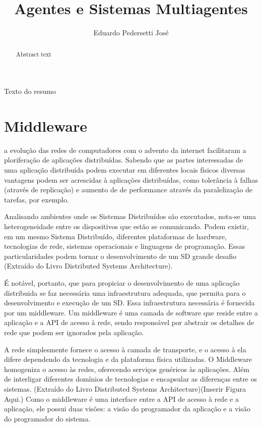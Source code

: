 \documentclass[12pt]{article}
\title{Agentes e Sistemas Multiagentes}
\author{Eduardo Pedersetti José\inst{1}}
\begin{document}
 

\maketitle

\begin{abstract}
  Abstract text
\end{abstract}
     
\begin{resumo} 
  Texto do resumo
\end{resumo}

\section{Middleware}
a evolução das redes de computadores com o advento da internet facilitaram a ploriferação 
de aplicações distribuídas. Sabendo que as partes interessadas de uma aplicação distribuída
podem executar em diferentes locais físicos diversas vantagens podem ser acrescidas à aplicações
distribuídas, como tolerância à falhas (através de replicação) e aumento de de performance através
da paralelização de tarefas, por exemplo.

Analisando ambientes onde os Sistemas Distribuídos são executados, nota-se uma heterogeneidade
entre os dispositivos que estão se comunicando. Podem existir, em um mesmo Sistema Distribuído, diferentes plataformas de hardware, tecnologias de rede, sistemas operacionais e linguagens de programação. Essas particularidades podem tornar o desenvolvimento de um SD grande desafio  (Extraído do Livro Distributed Systems Architecture).

É notável, portanto, que para propiciar o desenvolvimento de uma aplicação distribuida se faz necessária uma infraestrutura adequada, que permita para o desenvolvimento e execução de um SD. Essa infraestrutura necessária é fornecida por um middleware. Um middleware é uma camada de software que reside entre a aplicação e a API de acesso à rede, sendo responsável por abstrair os detalhes de rede que podem ser ignorados pela aplicação.

A rede simplesmente fornece o acesso à camada de transporte, e o acesso à ela difere dependendo da tecnologia e da plataforma física utilizadas. O Middleware homogeniza o acesso às redes, oferecendo serviços genéricos às aplicações. Além de interligar diferentes domínios de tecnologias e encapsular as diferenças entre os sistemas. (Extraído do Livro Distributed Systems Architecture)(Inserir Figura Aqui.)
Como o middleware é uma interface entre a API de acesso à rede e a aplicação, ele possui duas visões: a visão do programador da aplicação e a visão do programador do sistema.
\end{document}
